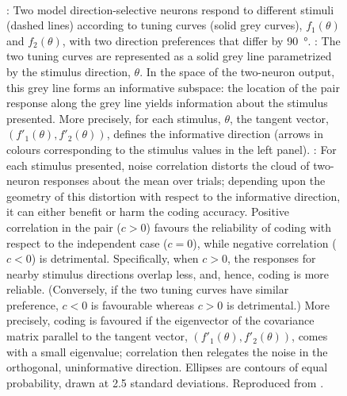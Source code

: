 \begin{figure}
\centering
\hspace*{\fill}
\hspace*{\fill}\hspace{.2cm}\hspace*{\fill}
\hspace*{\fill}
\\
%
\caption{%
\protect{}: Two model direction-selective neurons respond to different stimuli (dashed lines) according to tuning curves (solid grey curves), $f_1(\theta)$ and $f_2(\theta)$, with two direction preferences that differ by \SI{90}{\degree}.
\protect{}: The two tuning curves are represented as a solid grey line parametrized by the stimulus direction, $\theta$.
In the space of the two-neuron output, this grey line forms an informative subspace: the location of the pair response along the grey line yields information about the stimulus presented.
More precisely, for each stimulus, $\theta$, the tangent vector, $(f'_1(\theta),f'_2(\theta))$, defines the informative direction (arrows in colours corresponding to the stimulus values in the left panel).
\protect{}: For each stimulus presented, noise correlation distorts the cloud of two-neuron responses about the mean over trials; depending upon the geometry of this distortion with respect to the informative direction, it can either benefit or harm the coding accuracy.
Positive correlation in the pair ($c>0$) favours the reliability of coding with respect to the independent case ($c=0$), while negative correlation ($c<0$) is detrimental.
Specifically, when $c>0$, the responses for nearby stimulus directions overlap less, and, hence, coding is more reliable.
(Conversely, if the two tuning curves have similar preference, $c<0$ is favourable whereas $c>0$ is detrimental.)
More precisely, coding is favoured if the eigenvector of the covariance matrix parallel to the tangent vector, $(f'_1(\theta),f'_2(\theta))$, comes with a small eigenvalue; correlation then relegates the noise in the orthogonal, uninformative direction.
Ellipses are contours of equal probability, drawn at \num{2.5} standard deviations.
Reproduced from \citet{Franke2016}.
}
\label{fig:Franke2016}
%
\end{figure}
